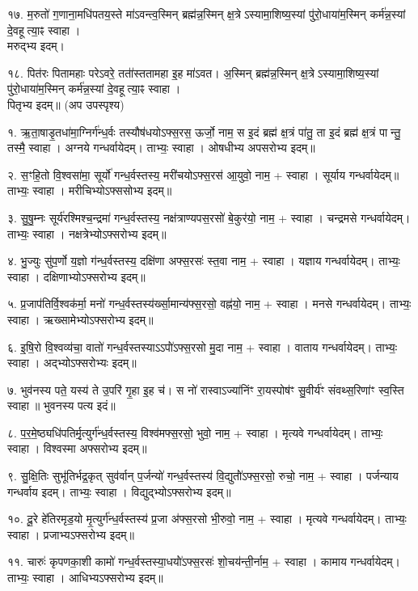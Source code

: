 १७. म॒रुतो॑ ग॒णाना॒मधि॑पतय॒स्ते मा॑ऽवन्त्व॒स्मिन् ब्रह्म॑न्न॒स्मिन् क्ष॒त्रेऽस्यामा॒शिष्य॒स्यां पु॑रो॒धाया॑म॒स्मिन् कर्म॑न्न॒स्यां दे॒वहूत्या॒ꣴ स्वाहा।\\
मरुद्भ्य इदम्।

१८. पित॑रः पितामहाः परेऽवरे॒ तता॑॑स्ततामहा इ॒ह मा॑ऽवत। अ॒स्मिन् ब्रह्म॑न्न॒स्मिन् क्ष॒त्रेऽस्यामा॒शिष्य॒स्यां पु॑रो॒धाया॑म॒स्मिन् कर्म॑न्न॒स्यां दे॒वहूत्या॒ꣴ स्वाहा।\\
पितृभ्य इदम्॥ (अप उपस्पृश्य)


१. ऋ॒ता॒षाडृ॒तधा॑मा॒ग्निर्ग॑न्ध॒र्वः तस्यौष॑धयोऽफ्स॒रस॒ ऊर्जो॒ नाम॒
स इ॒दं ब्रह्म॑ क्ष॒त्रं पा॑तु॒ ता इ॒दं ब्रह्म॑ क्ष॒त्रं पान्तु॒ तस्मै॒ स्वाहा। 
अग्नये गन्धर्वायेदम्। ताभ्यः॒ स्वाहा। ओषधीभ्य अपसरोभ्य इदम्॥

२. स॒ꣳहि॒तो वि॒श्वसा॑मा॒ सूर्यो॑ गन्ध॒र्वस्तस्य॒ मरी॑चयोऽफ्स॒रस॑ आ॒युवो॒ नाम॒ + स्वाहा।
सूर्याय गन्धर्वायेदम्॥ ताभ्यः॒ स्वाहा। मरीचिभ्योऽफ्ससोभ्य इदम्॥

३. सु॒षु॒म्नः सूर्य॑रश्मिश्च॒न्द्रमा॑ गन्ध॒र्वस्तस्य॒ नक्ष॑त्राण्यपस॒रसो॑ बे॒कुर॑यो॒ नाम॒ + स्वाहा।
चन्द्रमसे गन्धर्वायेदम्। ताभ्यः॒ स्वाहा। नक्षत्रेभ्योऽफ्सरोभ्य इदम्॥

४. भु॒ज्युः सु॑प॒र्णो य॒ज्ञो ग॑न्ध॒र्वस्तस्य॒ दक्षि॑णा अफ्स॒रसः॑ स्त॒वा नाम॒ + स्वाहा।
यज्ञाय गन्धर्वायेदम्। ताभ्यः॒ स्वाहा। दक्षिणाभ्योऽफ्सरोभ्य इदम्॥

५. प्र॒जाप॑तिर्वि॒श्वक॑र्मा॒ मनो॑ गन्ध॒र्वस्तस्य॑र्ख्सा॒मान्य॑फ्स॒रसो॒ वह्न॑यो॒ नाम॒ + स्वाहा।
मनसे गन्धर्वायेदम्। ताभ्यः॒ स्वाहा। ऋख्सामेभ्योऽफ्सरोभ्य इदम्॥

६. इ॒षि॒रो वि॒श्वव्य॑चा॒ वातो॑ गन्ध॒र्वस्तस्याऽऽपो॑॑ऽफ्स॒रसो मु॒दा नाम॒ + स्वाहा।
वाताय गन्धर्वायेदम्। ताभ्यः॒ स्वाहा। अद्भ्योऽफ्सरोभ्यः इदम्॥

७. भुव॑नस्य पते॒ यस्य॑ ते उ॒परि॑ गृ॒हा इ॒ह च॑।
स नो॑ रास्वाऽज्या॑निंꣳ रा॒यस्पोष॑ꣳ सु॒वीर्य॑ꣳ संवथ्स॒रिणा॑ꣳ स्व॒स्ति स्वाहा॥ भुवनस्य पत्य इदं॥

८. प॒र॒मे॒ष्ठ्यधि॑पतिर्मृ॒त्युर्ग॑न्ध॒र्वस्तस्य॒ विश्व॑मफ्स॒रसो॒ भुवो॒ नाम॒ + स्वाहा।
मृत्यवे गन्धर्वायेदम्। ताभ्यः॒ स्वाहा। विश्वस्मा अफ्सरोभ्य इदम्॥

९. सु॒क्षि॒तिः सुभू॑तिर्भद्र॒कृत् सुव॑र्वान् प॒र्जन्यो॑ गन्ध॒र्वस्तस्य॑ वि॒द्युतो॑॑ऽफ्स॒रसो॒ रुचो॒ नाम॒ + स्वाहा। पर्जन्याय गन्धर्वाय इदम्। ताभ्यः॒ स्वाहा। विद्युद्भ्योऽफ्सरोभ्य इदम्॥

१०. दू॒रे हे॑तिरमृड॒यो मृ॒त्युर्ग॑न्ध॒र्वस्तस्य॑ प्र॒जा अ॑फ्स॒रसो भी॒रुवो॒ नाम॒ + स्वाहा।
मृत्यवे गन्धर्वायेदम्। ताभ्यः॒ स्वाहा। प्रजाभ्यऽफ्सरोभ्य इदम्॥

११. चारुः॑ कृपणका॒शी कामो॑ गन्ध॒र्वस्तस्या॒धयो॑॑ऽफ्स॒रसः॑ शो॒चय॑न्ती॒र्नाम॒ + स्वाहा।
कामाय गन्धर्वायेदम्। ताभ्यः॒ स्वाहा। आधिभ्यऽफ्सरोभ्य इदम्॥

